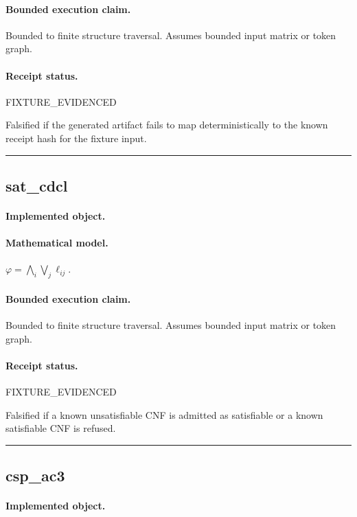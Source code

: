 \paragraph{Bounded execution claim.} Bounded to finite structure traversal. Assumes bounded input matrix or token graph.
\paragraph{Receipt status.} FIXTURE\_EVIDENCED
\begin{falsifier}
Falsified if the generated artifact fails to map deterministically to the known receipt hash for the fixture input.
\end{falsifier}

\vspace{1em}\hrule\vspace{1em}
\subsection{sat\_cdcl}
\paragraph{Implemented object.} 
\paragraph{Mathematical model.} $\varphi=\bigwedge_i\bigvee_j\ell_{ij}.$
\paragraph{Bounded execution claim.} Bounded to finite structure traversal. Assumes bounded input matrix or token graph.
\paragraph{Receipt status.} FIXTURE\_EVIDENCED
\begin{falsifier}
Falsified if a known unsatisfiable CNF is admitted as satisfiable or a known satisfiable CNF is refused.
\end{falsifier}

\vspace{1em}\hrule\vspace{1em}
\subsection{csp\_ac3}
\paragraph{Implemented object.} 
